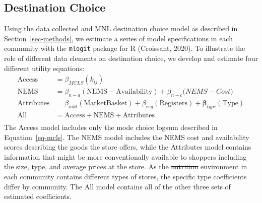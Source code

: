 \documentclass[
  letterpaper,
  number,
  review,
  3p]{elsarticle}
\makeatletter
\providecommand{\DIFadd}[1]{{\protect\color{blue}\uwave{#1}}} %
\providecommand{\DIFdel}[1]{{\protect\color{red}\sout{#1}}} %
\providecommand{\DIFaddbegin}{} %
\providecommand{\DIFaddend}{} %
\providecommand{\DIFdelbegin}{} %
\providecommand{\DIFdelend}{} %
\newcommand{\DIFscaledelfig}{0.5}
\newlength{\DIFdelgraphicswidth} %
\newlength{\DIFdelgraphicsheight} %
\newcommand{\DIFaddincludegraphics}[2][]{{\color{blue}\fbox{\DIFOincludegraphics[#1]{#2}}}} %
\newcommand{\DIFdelincludegraphics}[2][]{%
\sbox{\DIFdelgraphicsbox}{\DIFOincludegraphics[#1]{#2}}%
\settoboxwidth{\DIFdelgraphicswidth}{\DIFdelgraphicsbox} %
\settoboxtotalheight{\DIFdelgraphicsheight}{\DIFdelgraphicsbox} %
\scalebox{\DIFscaledelfig}{%
\parbox[b]{\DIFdelgraphicswidth}{\usebox{\DIFdelgraphicsbox}\\[-\baselineskip] \rule{\DIFdelgraphicswidth}{0em}}\llap{\resizebox{\DIFdelgraphicswidth}{\DIFdelgraphicsheight}{%
\setlength{\unitlength}{\DIFdelgraphicswidth}%
\begin{picture}(1,1)%
\thicklines\linethickness{2pt} %
{\color[rgb]{1,0,0}\put(0,0){\framebox(1,1){}}}%
{\color[rgb]{1,0,0}\put(0,0){\line( 1,1){1}}}%
{\color[rgb]{1,0,0}\put(0,1){\line(1,-1){1}}}%
\end{picture}%
}\hspace*{3pt}}} %
} %
\DeclareRobustCommand{\DIFaddbegin}{\DIFOaddbegin \let\includegraphics\DIFaddincludegraphics} %
\DeclareRobustCommand{\DIFaddend}{\DIFOaddend \let\includegraphics\DIFOincludegraphics} %
\DeclareRobustCommand{\DIFdelbegin}{\DIFOdelbegin \let\includegraphics\DIFdelincludegraphics} %
\DeclareRobustCommand{\DIFdelend}{\DIFOaddend \let\includegraphics\DIFOincludegraphics} %
\let\sout@orig\sout %
\renewcommand{\sout}[1]{\ifmmode\text{\sout@orig{\ensuremath{#1}}}\else\sout@orig{#1}\fi} %
\makeatother
\begin{document}
\subsection{Destination Choice}\label{sec-estimation}

Using the data collected and MNL destination choice model as described
in Section~\ref{sec-methods}, we estimate a series of model
specifications in each community with the \texttt{mlogit} package for R
(Croissant, 2020). To illustrate the role of different data elements on
destination choice, we develop and estimate four different utility
equations: \begin{align*}
\mathrm{Access} &= \beta_{MCLS}( k_{ij})\\
\mathrm{NEMS} &= \beta_{n-a} (\mathrm{NEMS-Availability}) + \beta_{n-c}\mathrm({NEMS-Cost})\\
\mathrm{Attributes} &= \beta_{mkt} (\mathrm{Market Basket}) + \beta_{reg} (\mathrm{Registers}) + \mathbf{\beta}_{type}(\mathrm{Type})\\
\mathrm{All} &= \mathrm{Access} + \mathrm{NEMS} + \mathrm{Attributes}\\
\end{align*} The Access model includes only the mode choice logsum
described in Equation~\ref{eq-mcls}. The NEMS model includes the NEMS
cost and availability scores describing the goods the store offers,
while the Attributes model contains information that might be more
conventionally available to shoppers including the size, type, and
average prices at the store. As the \DIFdelbegin \DIFdel{nutrition }\DIFdelend \DIFaddbegin \DIFadd{food }\DIFaddend environment in each community
contains different types of stores, the specific type coefficients
differ by community. The All model contains all of the other three sets
of estimated coefficients.
\end{document}

